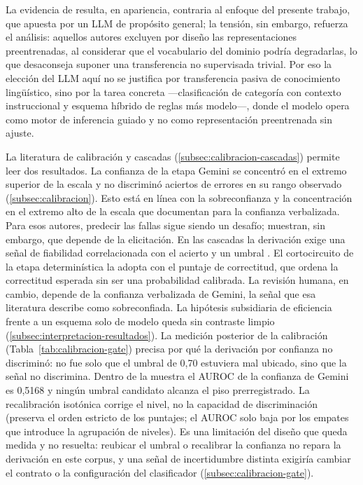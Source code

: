 La evidencia de \textcite{Revina2020_it_tickets} resulta, en apariencia, contraria al enfoque del presente trabajo, que apuesta por un LLM de propósito general; la tensión, sin embargo, refuerza el análisis: aquellos autores excluyen por diseño las representaciones preentrenadas, al considerar que el vocabulario del dominio podría degradarlas, lo que desaconseja suponer una transferencia no supervisada trivial. Por eso la elección del LLM aquí no se justifica por transferencia pasiva de conocimiento lingüístico, sino por la tarea concreta ---clasificación de categoría con contexto instruccional y esquema híbrido de reglas más modelo---, donde el modelo opera como motor de inferencia guiado y no como representación preentrenada sin ajuste.

La literatura de calibración y cascadas (\autoref{subsec:calibracion-cascadas}) permite leer dos resultados. La confianza de la etapa Gemini se concentró en el extremo superior de la escala y no discriminó aciertos de errores en su rango observado (\autoref{subsec:calibracion}). Esto está en línea con la sobreconfianza y la concentración en el extremo alto de la escala que \textcite{Xiong2024_confidence_elicitation} documentan para la confianza verbalizada. Para esos autores, predecir las fallas sigue siendo un desafío; \textcite{Tian2023_verbalized_confidence} muestran, sin embargo, que depende de la elicitación. En las cascadas la derivación exige una señal de fiabilidad correlacionada con el acierto y un umbral \parencite{Varshney2022_model_cascading, Chen2024_frugalgpt}. El cortocircuito de la etapa determinística la adopta con el puntaje de correctitud, que ordena la correctitud esperada sin ser una probabilidad calibrada. La revisión humana, en cambio, depende de la confianza verbalizada de Gemini, la señal que esa literatura describe como sobreconfiada. La hipótesis subsidiaria de eficiencia frente a un esquema solo de modelo queda sin contraste limpio (\autoref{subsec:interpretacion-resultados}). La medición posterior de la calibración (Tabla~\ref{tab:calibracion-gate}) precisa por qué la derivación por confianza no discriminó: no fue solo que el umbral de 0,70 estuviera mal ubicado, sino que la señal no discrimina. Dentro de la muestra el AUROC de la confianza de Gemini es 0,5168 y ningún umbral candidato alcanza el piso prerregistrado. La recalibración isotónica corrige el nivel, no la capacidad de discriminación (preserva el orden estricto de los puntajes; el AUROC solo baja por los empates que introduce la agrupación de niveles). Es una limitación del diseño que queda medida y no resuelta: reubicar el umbral o recalibrar la confianza no repara la derivación en este corpus, y una señal de incertidumbre distinta exigiría cambiar el contrato o la configuración del clasificador (\autoref{subsec:calibracion-gate}).

